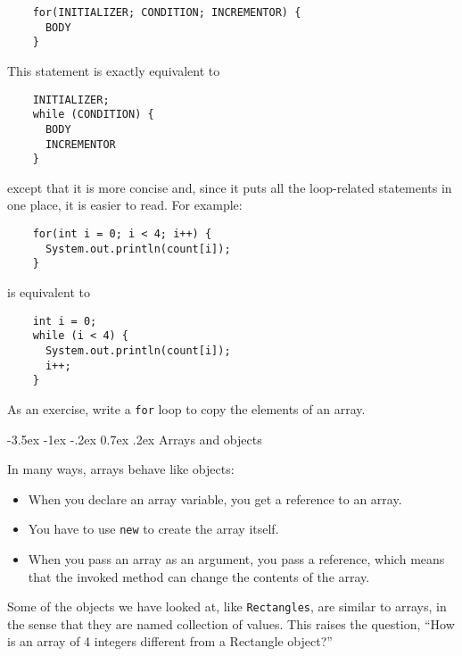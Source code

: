 \documentclass{book}
\makeatletter
\renewcommand{\section}{\@startsection 
    {section} {1} {0mm}%
    {-3.5ex \@plus -1ex \@minus -.2ex}%
    {0.7ex \@plus.2ex}%
    {\normalfont\Large\bfseries}}
\makeatother
\begin{document}
\begin{verbatim}
    for(INITIALIZER; CONDITION; INCREMENTOR) {
      BODY
    }
\end{verbatim}
%
This statement is exactly equivalent to

\begin{verbatim}
    INITIALIZER;
    while (CONDITION) {
      BODY
      INCREMENTOR
    }
\end{verbatim}
%
except that it is more concise and, since it puts all the
loop-related statements in one place, it is easier to read.
For example:

\begin{verbatim}
    for(int i = 0; i < 4; i++) {
      System.out.println(count[i]);
    }
\end{verbatim}
%
is equivalent to 

\begin{verbatim}
    int i = 0;
    while (i < 4) {
      System.out.println(count[i]);
      i++;
    }
\end{verbatim}
%
As an exercise, write a {\tt for} loop to copy the elements
of an array.

\section{Arrays and objects}

In many ways, arrays behave like objects:

\begin{itemize}

\item When you declare an array variable, you get a reference
to an array.

\item You have to use {\tt new} to create the array
itself.

\item When you pass an array as an argument, you pass a reference,
which means that the invoked method can change the contents
of the array.

\end{itemize}

Some of the objects we have looked at, like {\tt Rectangles}, are
similar to arrays, in the sense that they are named collection of
values.  This raises the question, ``How is an array of 4 integers
different from a Rectangle object?''

\end{document}

